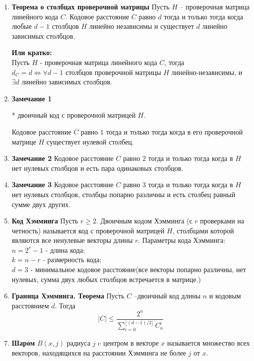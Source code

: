 \documentclass[a4paper, 12pt]{report}
\begin{document}
\begin{enumerate}


\item \textbf{Теорема о столбцах проверочной матрицы}
Пусть $H$ – проверочная матрица линейного кода $C$. Кодовое
расстояние $C$ равно $d$ тогда и только тогда когда любые $d - 1$
столбцов $H$ линейно независимы и существует $d$ линейно
зависимых столбцов.

\textbf{Или кратко:}\\
Пусть $H$ - проверочная матрица линейного кода $C$, тогда\\
$d_{C} = d \Leftrightarrow \forall d-1$ столбцов проверочной матрицы $H$ линейно-независимы, и $\exists d$ линейно зависимых столбцов.


\item \textbf{Замечание 1}

* двоичный код с проверочной матрицей $H$.

Кодовое расстояние $C$ равно $1$ тогда и только тогда когда в
его проверочной матрице $H$ существует нулевой столбец.

\item \textbf{Замечание 2}
Кодовое расстояние $C$ равно $2$ тогда и только тогда когда в
$H$ нет нулевых столбцов и есть пара одинаковых столбцов.

\item \textbf{Замечание 3}
Кодовое расстояние $C$ равно $3$ тогда и только тогда когда в
$H$ нет нулевых столбцов, столбцы попарно различны и есть
столбец равный сумме двух других.

\item \textbf{Код Хэмминга}
Пусть $r \geq 2$. Двоичным кодом Хэмминга (с $r$ проверками на
четность) называется код с проверочной матрицей $H$,
столбцами которой являются все ненулевые векторы длины $r$.
Параметры кода Хэмминга:\\
$n = 2^{r} - 1$ - длина кода;\\
$k = n - r$ - размерность кода;\\
$d = 3$ - минимальное кодовое расстояние(все векторы попарно различны, нет нулевых, сумма двух любых столбцов встречается в матрице.)

\item \textbf{Граница Хэмминга. Теорема}
Пусть $C$ –двоичный код длины $n$ и кодовым расстоянием $d$.
Тогда
\[  |C| \leq \frac {2^n} {{\sum_{i = 0}^{\lfloor(d - 1)/2\rfloor} C_n^i}} \]


\item \textbf{Шаром }  $B(x, j)$ радиуса $j$ c центром в векторе $x$ называется
множество всех векторов, находящихся на расстоянии
Хэмминга не более $j$ от $x$.


\end{enumerate}
\end{document}

